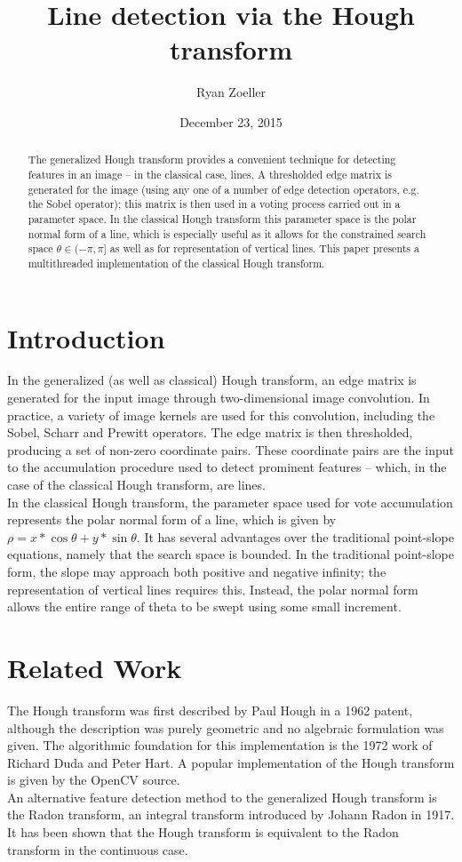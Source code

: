 \documentclass[letterpaper,12pt]{article}
\title{Line detection via the Hough transform}
\date{December 23, 2015}
\author{Ryan Zoeller}
\begin{document}

\maketitle

\begin{abstract}
The generalized Hough transform provides a convenient technique for detecting features in an image --
in the classical case, lines.
A thresholded edge matrix is generated for the image (using any one of a number of edge detection
operators, e.g. the Sobel operator); this matrix is then used in a voting process carried
out in a parameter space. In the classical Hough transform this parameter space is the polar
normal form of a line, which is especially useful as it allows for the constrained
search space $\theta \in (-\pi,\pi]$ as well as for representation of vertical lines.
This paper presents a multithreaded implementation of the classical Hough transform.
\end{abstract}

\newpage

\section{Introduction}
In the generalized (as well as classical) Hough transform, an edge matrix is generated
for the input image through two-dimensional image convolution. In practice, a variety of image
kernels are used for this convolution, including the Sobel, Scharr and Prewitt operators.
The edge matrix is then thresholded, producing a set of non-zero coordinate pairs.
These coordinate pairs are the input to the accumulation procedure used to detect prominent
features -- which, in the case of the classical Hough transform, are lines.
\\
In the classical Hough transform, the parameter space used for vote accumulation represents
the polar normal form of a line, which is given by $\rho=x*\cos{\theta}+y*\sin{\theta}$.
It has several advantages over the traditional point-slope equations, namely that the search
space is bounded. In the traditional point-slope form, the slope may approach both positive
and negative infinity; the representation of vertical lines requires this. Instead, the
polar normal form allows the entire range of theta to be swept using some small increment.

\section{Related Work}
The Hough transform was first described by Paul Hough in a 1962 patent\cite{paulhough1962},
although the description was purely geometric and no algebraic formulation was given.
The algorithmic foundation for this implementation is the 1972 work of Richard Duda
and Peter Hart\cite{dudahart1972}. A popular implementation of the Hough transform is
given by the OpenCV source.
\\
An alternative feature detection method to the generalized Hough transform is the Radon transform,
an integral transform introduced by Johann Radon in 1917. It has been shown that the Hough transform
is equivalent to the Radon transform in the continuous case\cite{radonhough}.
\end{document}
